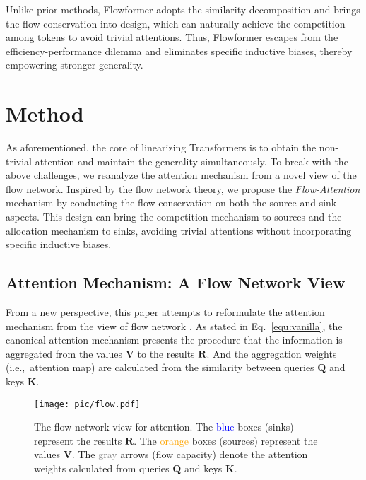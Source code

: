 \documentclass[nohyperref]{article}
\theoremstyle{plain}
\theoremstyle{definition}
\theoremstyle{remark}
\begin{document}
Unlike prior methods, Flowformer adopts the similarity decomposition and brings the flow conservation into design, which can naturally achieve the competition among tokens to avoid trivial attentions. Thus, Flowformer escapes from the efficiency-performance dilemma and eliminates specific inductive biases, thereby empowering stronger generality.


\section{Method}

As aforementioned, the core of linearizing Transformers is to obtain the non-trivial attention and maintain the generality simultaneously. To break with the above challenges, we reanalyze the attention mechanism from a novel view of the flow network. Inspired by the flow network theory, we propose the \emph{Flow-Attention} mechanism by conducting the flow conservation on both the source and sink aspects. This design can bring the competition mechanism to sources and the allocation mechanism to sinks, avoiding trivial attentions without incorporating specific inductive biases.

\subsection{Attention Mechanism: A Flow Network View}

From a new perspective, this paper attempts to reformulate the attention mechanism from the view of flow network \cite{Ahuja1993NetworkF}. As stated in Eq.~\eqref{equ:vanilla}, the canonical attention mechanism presents the procedure that the information is aggregated from the values $\mathbf{V}$ to the results $\mathbf{R}$. And the aggregation weights (i.e.,~attention map) are calculated from the similarity between queries $\mathbf{Q}$ and keys $\mathbf{K}$. 

\begin{figure}[h]
    \begin{center}
    \centerline{\texttt{[image: pic/flow.pdf]}}
    \vspace{-5pt}
    \caption{The flow network view for attention. The \textcolor{blue}{blue} boxes (sinks) represent the results $\mathbf{R}$. The \textcolor{orange}{orange} boxes (sources) represent the values $\mathbf{V}$. The \textcolor{gray}{gray} arrows (flow capacity) denote the attention weights calculated from queries $\mathbf{Q}$ and keys $\mathbf{K}$.}
    \label{fig:flow-view}
    \end{center}
    \vspace{-15pt}
\end{figure}
\end{document}
